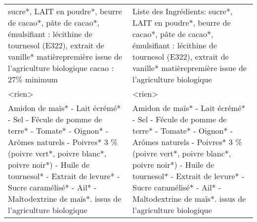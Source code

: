 \begin{longtable}{p{7cm}p{7cm}}
\bottomrule
\endlastfoot
                                                                                                 sucre*, LAIT en poudre*, beurre de cacao*, pâte de cacao*, émulsifiant : lécithine de tournesol (E322), extrait de \newline vanille* \newline * matièrepremière issue de l'agriculture biologique \newline cacao : 27\% minimum &                                                                                                                                                                                                                                                         Liste des Ingrédients: \newline sucre*,  LAIT en poudre*,  beurre de cacao*,  pâte de cacao*,  émulsifiant : lécithine de tournesol (E322),  extrait de  \newline vanille* \newline * matièrepremière issue de l'agriculture biologique \\
                                                                                                                                                                                                                                                                                                 <rien> &                                                                                                                                                                                                                                                                                                                                                                                                                                                                  <rien> \\
 Amidon de maïs* - Lait écrémé* - Sel - Fécule de pomme de terre* - Tomate* - Oignon* - Arômes naturels - Poivres* 3 \% (poivre vert*, poivre blanc*, poivre noir*) - Huile de tournesol* - Extrait de levure* - Sucre caramélisé* - Ail* - Maltodextrine de maïs*. \newline * issus de l'agriculture biologique &                                                                                                                                                               Amidon de maïs* - Lait écrémé* - Sel - Fécule de pomme de terre* - Tomate* - Oignon* - Arômes naturels - Poivres* 3 \% (poivre vert*, poivre blanc*,  \newline poivre noir*) - Huile de tournesol* - Extrait de levure* - Sucre caramélisé* - Ail* - Maltodextrine de maïs*.  \newline * issus de l’agriculture biologique \\

\end{longtable}
